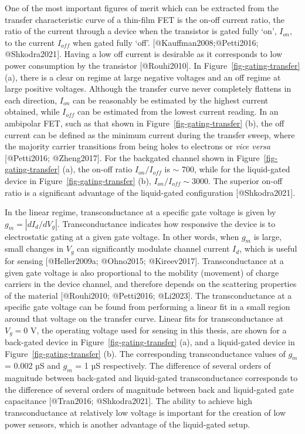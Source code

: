 \documentclass[
  letterpaper,
  DIV=11,
  numbers=noendperiod]{scrartcl}
\begin{document}
One of the most important figures of merit which can be extracted from
the transfer characteristic curve of a thin-film FET is the on-off
current ratio, the ratio of the current through a device when the
transistor is gated fully `on', \(I_{on}\), to the current \(I_{off}\)
when gated fully `off'. {[}@Kauffman2008;@Petti2016; @Shkodra2021{]}.
Having a low off current is desirable as it corresponds to low power
consumption by the transistor {[}@Rouhi2010{]}. In
Figure~\ref{fig-gating-transfer} (a), there is a clear on regime at
large negative voltages and an off regime at large positive voltages.
Although the transfer curve never completely flattens in each direction,
\(I_{on}\) can be reasonably be estimated by the highest current
obtained, while \(I_{off}\) can be estimated from the lowest current
reading. In an ambipolar FET, such as that shown in
Figure~\ref{fig-gating-transfer} (b), the off current can be defined as
the minimum current during the transfer sweep, where the majority
carrier transitions from being holes to electrons or \emph{vice versa}
{[}@Petti2016; @Zheng2017{]}. For the backgated channel shown in
Figure~\ref{fig-gating-transfer} (a), the on-off ratio
\(I_{on}/I_{off}\) is \(\sim\) 700, while for the liquid-gated device in
Figure~\ref{fig-gating-transfer} (b), \(I_{on}/I_{off} \sim 3000\). The
superior on-off ratio is a significant advantage of the liquid-gated
configuration {[}@Shkodra2021{]}.

In the linear regime, transconductance at a specific gate voltage is
given by \(g_m = |dI_{d}/dV_g|\). Transconductance indicates how
responsive the device is to electrostatic gating at a given gate
voltage. In other words, when \(g_m\) is large, small changes in \(V_g\)
can significantly modulate channel current \(I_d\), which is useful for
sensing {[}@Heller2009a; @Ohno2015; @Kireev2017{]}. Transconductance at
a given gate voltage is also proportional to the mobility (movement) of
charge carriers in the device channel, and therefore depends on the
scattering properties of the material {[}@Rouhi2010; @Petti2016;
@Li2023{]}. The transconductance at a specific gate voltage can be found
from performing a linear fit in a small region around that voltage on
the transfer curve. Linear fits for transconductance at \(V_g = 0\) V,
the operating voltage used for sensing in this thesis, are shown for a
back-gated device in Figure~\ref{fig-gating-transfer} (a), and a
liquid-gated device in Figure~\ref{fig-gating-transfer} (b). The
corresponding transconductance values of \(g_m\) = 0.002 µS and \(g_m\)
= 1 µS respectively. The difference of several orders of magnitude
between back-gated and liquid-gated transconductance corresponds to the
difference of several orders of magnitude between back and liquid-gated
gate capacitance {[}@Tran2016; @Shkodra2021{]}. The ability to achieve
high transconductance at relatively low voltage is important for the
creation of low power sensors, which is another advantage of the
liquid-gated setup.
\end{document}
